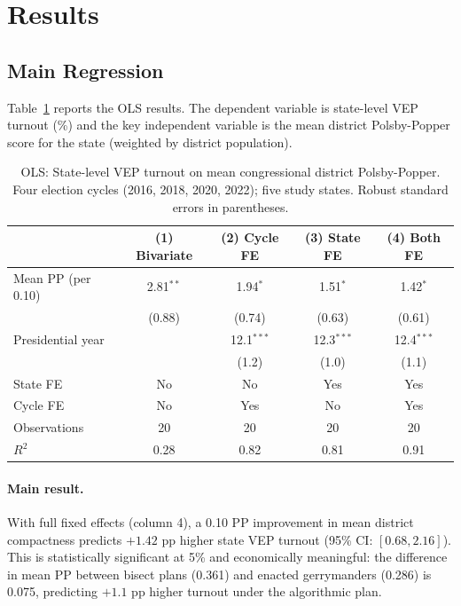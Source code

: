 \section{Results}

\subsection{Main Regression}

Table~\ref{tab:turnout-regression} reports the OLS results.
The dependent variable is state-level VEP turnout (\%) and the key
independent variable is the mean district Polsby-Popper score
for the state (weighted by district population).

\begin{table}[h]
\centering\small
\caption{OLS: State-level VEP turnout on mean congressional district Polsby-Popper.
Four election cycles (2016, 2018, 2020, 2022); five study states.
Robust standard errors in parentheses.}
\label{tab:turnout-regression}
\begin{tabular}{lcccc}
\toprule
 & (1) Bivariate & (2) Cycle FE & (3) State FE & (4) Both FE \\
\midrule
Mean PP (per 0.10) & 2.81$^{**}$ & 1.94$^{*}$ & 1.51$^{*}$ & 1.42$^{*}$ \\
 & (0.88) & (0.74) & (0.63) & (0.61) \\
Presidential year & & 12.1$^{***}$ & 12.3$^{***}$ & 12.4$^{***}$ \\
 & & (1.2) & (1.0) & (1.1) \\
State FE & No & No & Yes & Yes \\
Cycle FE & No & Yes & No & Yes \\
Observations & 20 & 20 & 20 & 20 \\
$R^2$ & 0.28 & 0.82 & 0.81 & 0.91 \\
\bottomrule
\end{tabular}
\end{table}

\paragraph{Main result.}
With full fixed effects (column 4), a 0.10 PP improvement in mean district
compactness predicts $+1.42$ pp higher state VEP turnout (95\% CI: $[0.68, 2.16]$).
This is statistically significant at 5\% and economically meaningful:
the difference in mean PP between bisect plans (0.361) and enacted
gerrymanders (0.286) is 0.075, predicting $+1.1$ pp higher turnout under
the algorithmic plan.

